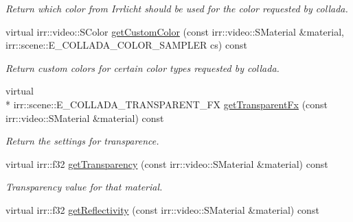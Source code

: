 \begin{DoxyCompactItemize}
\begin{DoxyCompactList}\small\item\em Return which color from Irrlicht should be used for the color requested by collada. \end{DoxyCompactList}\item 
\hypertarget{classirr_1_1scene_1_1_c_collada_mesh_writer_properties_add935642caaaedac95c0a058ef5ef39d}{virtual irr\-::video\-::\-S\-Color \hyperlink{classirr_1_1scene_1_1_c_collada_mesh_writer_properties_add935642caaaedac95c0a058ef5ef39d}{get\-Custom\-Color} (const irr\-::video\-::\-S\-Material \&material, irr\-::scene\-::\-E\-\_\-\-C\-O\-L\-L\-A\-D\-A\-\_\-\-C\-O\-L\-O\-R\-\_\-\-S\-A\-M\-P\-L\-E\-R cs) const }\label{classirr_1_1scene_1_1_c_collada_mesh_writer_properties_add935642caaaedac95c0a058ef5ef39d}

\begin{DoxyCompactList}\small\item\em Return custom colors for certain color types requested by collada. \end{DoxyCompactList}\item 
\hypertarget{classirr_1_1scene_1_1_c_collada_mesh_writer_properties_acdef47c2e21450badb30621e1274b80b}{virtual \\*
irr\-::scene\-::\-E\-\_\-\-C\-O\-L\-L\-A\-D\-A\-\_\-\-T\-R\-A\-N\-S\-P\-A\-R\-E\-N\-T\-\_\-\-F\-X \hyperlink{classirr_1_1scene_1_1_c_collada_mesh_writer_properties_acdef47c2e21450badb30621e1274b80b}{get\-Transparent\-Fx} (const irr\-::video\-::\-S\-Material \&material) const }\label{classirr_1_1scene_1_1_c_collada_mesh_writer_properties_acdef47c2e21450badb30621e1274b80b}

\begin{DoxyCompactList}\small\item\em Return the settings for transparence. \end{DoxyCompactList}\item 
\hypertarget{classirr_1_1scene_1_1_c_collada_mesh_writer_properties_a557c159b5d0948e56026cd03aa5a1779}{virtual irr\-::f32 \hyperlink{classirr_1_1scene_1_1_c_collada_mesh_writer_properties_a557c159b5d0948e56026cd03aa5a1779}{get\-Transparency} (const irr\-::video\-::\-S\-Material \&material) const }\label{classirr_1_1scene_1_1_c_collada_mesh_writer_properties_a557c159b5d0948e56026cd03aa5a1779}

\begin{DoxyCompactList}\small\item\em Transparency value for that material. \end{DoxyCompactList}\item 
\hypertarget{classirr_1_1scene_1_1_c_collada_mesh_writer_properties_a36475ed57fb88fc8225822e52420d379}{virtual irr\-::f32 \hyperlink{classirr_1_1scene_1_1_c_collada_mesh_writer_properties_a36475ed57fb88fc8225822e52420d379}{get\-Reflectivity} (const irr\-::video\-::\-S\-Material \&material) const }\label{classirr_1_1scene_1_1_c_collada_mesh_writer_properties_a36475ed57fb88fc8225822e52420d379}


\end{DoxyCompactItemize}
